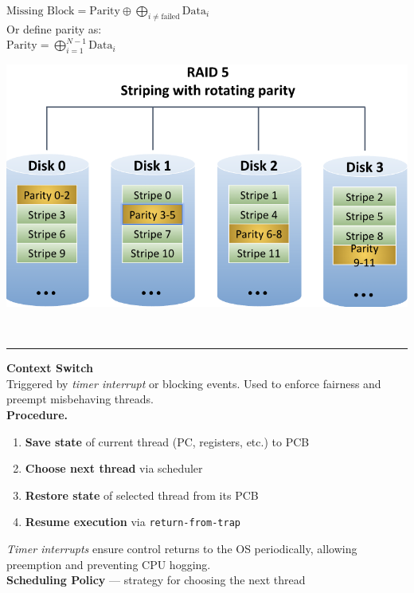 \documentclass[8pt]{extarticle}
\begin{document}
\begin{minipage}[t]{0.5\textwidth}
\begin{minipage}[htp]{0.48\textwidth}
$
                \text{Missing Block} = \text{Parity} \oplus \bigoplus_{i \neq \text{failed}} \text{Data}_i
$
            \\Or define parity as:\\
$
                \text{Parity} = \bigoplus_{i=1}^{N-1} \text{Data}_i
$
        \end{minipage}
        \hfill
        \begin{minipage}[htp]{0.48\textwidth}
            \includegraphics[width=1\textwidth]{images/raid5.png}
        \end{minipage}\\[3px]
        \hrule
        \vspace{3px}
        \noindent\textbf{Context Switch} \\
        Triggered by \textit{timer interrupt} or blocking events. Used to enforce fairness and preempt misbehaving threads.\\
        \textbf{Procedure.}
        \begin{enumerate}[noitemsep,topsep=0pt]
            \item \textbf{Save state} of current thread (PC, registers, etc.) to PCB
            \item \textbf{Choose next thread} via scheduler
            \item \textbf{Restore state} of selected thread from its PCB
            \item \textbf{Resume execution} via \texttt{return-from-trap}
        \end{enumerate}
        \noindent\textit{Timer interrupts} ensure control returns to the OS periodically, allowing preemption and preventing CPU hogging.\\
        \noindent\textbf{Scheduling Policy} — strategy for choosing the next thread
        

\end{minipage}
\end{document}
